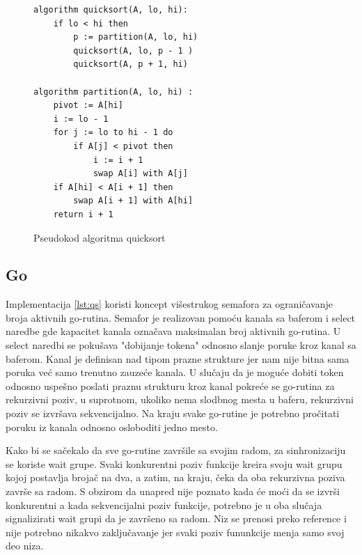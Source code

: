 \documentclass[12pt,oneside]{memoir}
\begin{document}
\begin{figure}
\begin{center}

\begin{Verbatim}[fontsize=\small]
algorithm quicksort(A, lo, hi):
    if lo < hi then
        p := partition(A, lo, hi)
        quicksort(A, lo, p - 1 )
        quicksort(A, p + 1, hi)

algorithm partition(A, lo, hi) :
    pivot := A[hi]
    i := lo - 1    
    for j := lo to hi - 1 do
        if A[j] < pivot then
            i := i + 1
            swap A[i] with A[j]
    if A[hi] < A[i + 1] then
        swap A[i + 1] with A[hi]
    return i + 1
\end{Verbatim}

\caption{Pseudokod algoritma quicksort}
\label{fig:qs_pseudo}
\end{center}
\end{figure}


\subsection{Go}
\label{qs:go}
Implementacija \ref{lst:qs} koristi koncept višestrukog semafora za ograničavanje broja aktivnih go-rutina. Semafor je realizovan pomoću kanala sa baferom i select naredbe gde kapacitet kanala označava maksimalan broj aktivnih go-rutina. U select naredbi se pokušava "dobijanje tokena" odnosno slanje poruke kroz kanal sa baferom. Kanal je definisan nad tipom prazne strukture jer nam nije bitna sama poruka već samo trenutno zauzeće kanala. U slučaju da je moguće dobiti token odnosno uspešno poslati praznu strukturu kroz kanal pokreće se go-rutina za rekurzivni poziv, u suprotnom, ukoliko nema slodbnog mesta u baferu, rekurzivni poziv se izvršava sekvencijalno. Na kraju svake go-rutine je potrebno pročitati poruku iz kanala odnosno osloboditi jedno mesto.

 Kako bi se sačekalo da sve go-rutine završile sa svojim radom, za sinhronizaciju se koriste wait grupe. Svaki konkurentni poziv funkcije kreira svoju wait grupu kojoj postavlja brojač na dva, a zatim, na kraju, čeka da oba rekurzivna poziva završe sa radom. S obzirom da unapred nije poznato kada će moći da se izvrši konkurentni a kada sekvencijalni poziv funkcije, potrebno je u oba slučaja signalizirati wait grupi da je završeno sa radom. Niz se prenosi preko reference i nije potrebno nikakvo zaključavanje jer svaki poziv fununkcije menja samo svoj deo niza.
\end{document}
